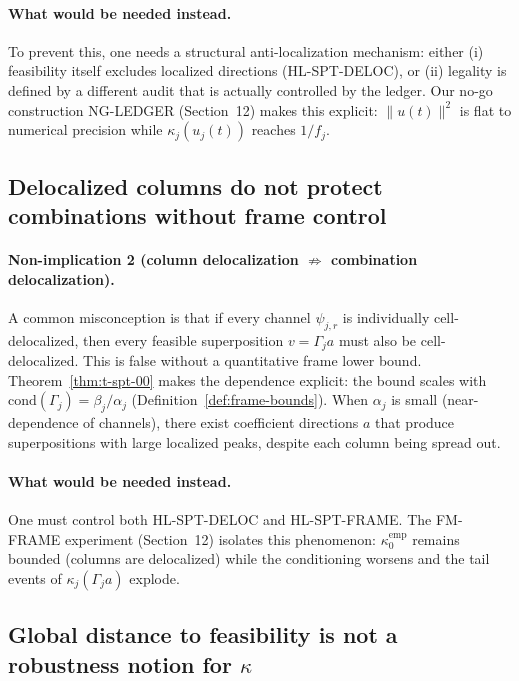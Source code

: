 \documentclass[11pt]{article}
\begin{document}
\paragraph{What would be needed instead.}
To prevent this, one needs a structural anti-localization mechanism: either (i) feasibility itself excludes localized directions (HL-SPT-DELOC), or (ii) legality is defined by a different audit that is actually controlled by the ledger.
Our no-go construction NG-LEDGER (Section~12) makes this explicit: $\|u(t)\|^2$ is flat to numerical precision while $\kappa_j(u_j(t))$ reaches $1/f_j$.

\subsection{Delocalized columns do not protect combinations without frame control}

\paragraph{Non-implication 2 (column delocalization $\not\Rightarrow$ combination delocalization).}
A common misconception is that if every channel $\psi_{j,r}$ is individually cell-delocalized, then every feasible superposition $v=\Gamma_j a$ must also be cell-delocalized.
This is false without a quantitative frame lower bound.
Theorem~\ref{thm:t-spt-00} makes the dependence explicit: the bound scales with $\mathrm{cond}(\Gamma_j)=\beta_j/\alpha_j$ (Definition~\ref{def:frame-bounds}).
When $\alpha_j$ is small (near-dependence of channels), there exist coefficient directions $a$ that produce superpositions with large localized peaks, despite each column being spread out.

\paragraph{What would be needed instead.}
One must control both HL-SPT-DELOC and HL-SPT-FRAME.
The FM-FRAME experiment (Section~12) isolates this phenomenon: $\kappa_0^{\mathrm{emp}}$ remains bounded (columns are delocalized) while the conditioning worsens and the tail events of $\kappa_j(\Gamma_j a)$ explode.

\subsection{Global distance to feasibility is not a robustness notion for $\kappa$}
\end{document}
